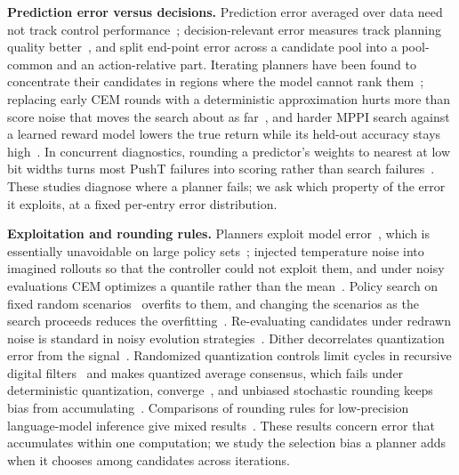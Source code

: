\documentclass[10pt]{article}
\begin{document}
\textbf{Prediction error versus decisions.} Prediction error averaged over data need not track control performance~\citep{lambert2020mismatch}; decision-relevant error measures track planning quality better~\citep{you2026predictability, wang2026drpe}, and \citet{min2026lowerror} split end-point error across a candidate pool into a pool-common and an action-relative part. Iterating planners have been found to concentrate their candidates in regions where the model cannot rank them~\citep{anon2026elitecert, anon2026resolution}; replacing early CEM rounds with a deterministic approximation hurts more than score noise that moves the search about as far~\citep{anon2026evaluations}, and harder MPPI search against a learned reward model lowers the true return while its held-out accuracy stays high~\citep{goodhart2026planner}. In concurrent diagnostics, rounding a predictor's weights to nearest at low bit widths turns most PushT failures into scoring rather than search failures~\citep{searchscoring2026}. These studies diagnose where a planner fails; we ask which property of the error it exploits, at a fixed per-entry error distribution.

\textbf{Exploitation and rounding rules.} Planners exploit model error~\citep{boney2019dae}, which is essentially unavoidable on large policy sets~\citep{bhamidipaty2026exploitable}; \citet{ha2018worldmodels} injected temperature noise into imagined rollouts so that the controller could not exploit them, and under noisy evaluations CEM optimizes a quantile rather than the mean~\citep{goschin2013cem}. Policy search on fixed random scenarios~\citep{ng2000pegasus} overfits to them, and changing the scenarios as the search proceeds reduces the overfitting~\citep{strens2002paired}. Re-evaluating candidates under redrawn noise is standard in noisy evolution strategies~\citep{hansen2009uncertainty}. Dither decorrelates quantization error from the signal~\citep{roberts1962picture, schuchman1964dither}. Randomized quantization controls limit cycles in recursive digital filters~\citep{kieburtz1977limit} and makes quantized average consensus, which fails under deterministic quantization, converge~\citep{aysal2008consensus}, and unbiased stochastic rounding keeps bias from accumulating~\citep{gupta2015limited, croci2022sr}. Comparisons of rounding rules for low-precision language-model inference give mixed results~\citep{chatelain2026sr, khilar2026dither, wu2026decisions}. These results concern error that accumulates within one computation; we study the selection bias a planner adds when it chooses among candidates across iterations.
\end{document}
